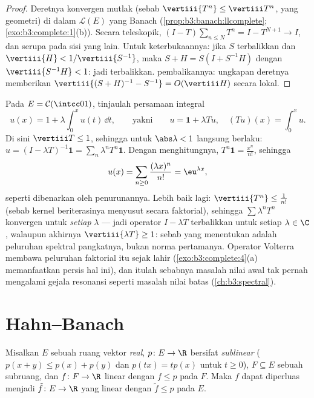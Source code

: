 \begin{proof}
Deretnya konvergen mutlak (sebab $\vertiii{T^n} \leq \vertiii
T^n$, yang geometri) di dalam $\mathcal L(E)$ yang Banach
(\cref{prop:b3:banach:llcomplete};
\cref{exo:b3:complete:1}(b)). Secara teleskopik, $(I - T)\sum_{n \leq
N}T^n = I - T^{N+1} \to I$, dan serupa pada sisi yang lain.
Untuk keterbukaannya: jika $S$ terbalikkan dan $\vertiii{H} <
1/\vertiii{S^{-1}}$, maka $S + H = S(I + S^{-1}H)$ dengan
$\vertiii{S^{-1}H} < 1$: jadi terbalikkan.  pembalikannya:
ungkapan deretnya memberikan $\vertiii{(S+H)^{-1} - S^{-1}} =
O(\vertiii H)$ secara lokal.
\end{proof}

\begin{example}
\label{ex:b3:banach:volterraexample}
Pada $E = \mathcal C(\intcc01)$, tinjaulah persamaan integral
\[
u(x) = 1 + \lambda\int_0^xu(t)\,\dd t,
\qquad\text{yakni}\qquad u = \mathbf 1 + \lambda Tu,
\quad (Tu)(x) = \int_0^xu .
\]
Di sini $\vertiii T \leq 1$, sehingga untuk $\abs\lambda < 1$ 
langsung berlaku: $u = (I - \lambda T)^{-1}\mathbf 1 =
\sum_n\lambda^nT^n\mathbf 1$. Dengan menghitungnya, $T^n\mathbf 1 =
\frac{x^n}{n!}$, sehingga
\[
u(x) = \sum_{n\geq0}\frac{(\lambda x)^n}{n!} =
\eu^{\lambda x} ,
\]
seperti dibenarkan oleh penurunannya. Lebih baik lagi: $\vertiii{T^n} \leq
\frac1{n!}$ (sebab kernel beriterasinya menyusut secara faktorial), sehingga
$\sum\lambda^nT^n$ konvergen untuk \emph{setiap} $\lambda$ ---
jadi operator $I - \lambda T$ terbalikkan untuk setiap $\lambda
\in \C$, walaupun akhirnya $\vertiii{\lambda T} \geq 1$:
sebab yang menentukan adalah peluruhan spektral pangkatnya, bukan
norma pertamanya. Operator Volterra membawa peluruhan faktorial itu
sejak lahir (\cref{exo:b3:complete:4}(a) memanfaatkan persis
hal ini), dan itulah sebabnya masalah nilai awal tak pernah mengalami
gejala resonansi seperti masalah nilai batas
(\cref{ch:b3:spectral}).
\end{example}

\section{Hahn--Banach}

\begin{theorem}
\label{thm:b3:banach:hahnbanach}
Misalkan $E$ sebuah ruang vektor \emph{real}, $p \colon E \to \R$
bersifat \emph{sublinear} ($p(x + y) \leq p(x) + p(y)$ dan $p(tx) =
tp(x)$ untuk $t \geq 0$), $F \subseteq E$ sebuah subruang, dan $f
\colon F \to \R$ linear dengan $f \leq p$ pada $F$. Maka $f$ dapat diperluas
menjadi $\tilde f \colon E \to \R$ yang linear dengan $\tilde f \leq p$
pada $E$.
\end{theorem}


